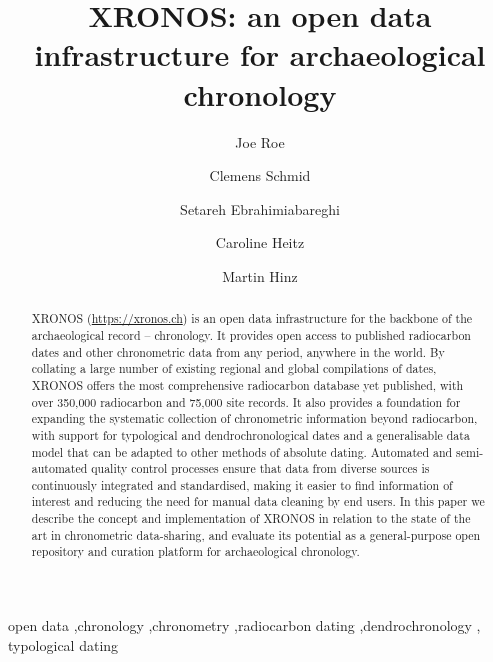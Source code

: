 \documentclass[
  number,
  doubleblind]{elsarticle}
\begin{document}
\begin{frontmatter}
\title{XRONOS: an open data infrastructure for archaeological
chronology}
\author[1]{Joe Roe%
%
}
\author[2]{Clemens Schmid%
%
}

\author[1]{Setareh Ebrahimiabareghi%
%
}

\author[1]{Caroline Heitz%
%
}

\author[1]{Martin Hinz%
%
}







        
\begin{abstract}
XRONOS (\url{https://xronos.ch}) is an open data infrastructure for the
backbone of the archaeological record -- chronology. It provides open
access to published radiocarbon dates and other chronometric data from
any period, anywhere in the world. By collating a large number of
existing regional and global compilations of dates, XRONOS offers the
most comprehensive radiocarbon database yet published, with over 350,000
radiocarbon and 75,000 site records. It also provides a foundation for
expanding the systematic collection of chronometric information beyond
radiocarbon, with support for typological and dendrochronological dates
and a generalisable data model that can be adapted to other methods of
absolute dating. Automated and semi-automated quality control processes
ensure that data from diverse sources is continuously integrated and
standardised, making it easier to find information of interest and
reducing the need for manual data cleaning by end users. In this paper
we describe the concept and implementation of XRONOS in relation to the
state of the art in chronometric data-sharing, and evaluate its
potential as a general-purpose open repository and curation platform for
archaeological chronology.
\end{abstract}





\begin{keyword}
    open data \sep chronology \sep chronometry \sep radiocarbon
dating \sep dendrochronology \sep 
    typological dating
\end{keyword}
\end{frontmatter}
    
\end{document}
